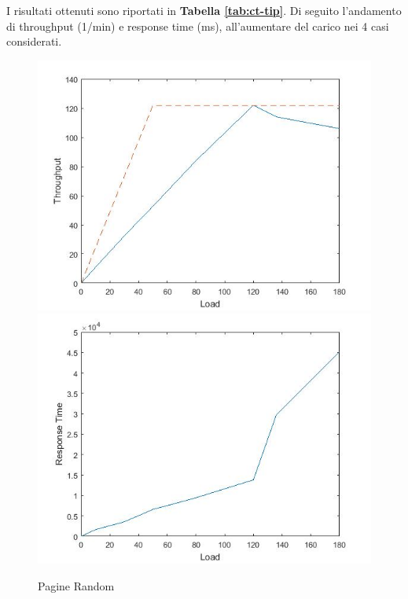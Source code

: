 		I risultati ottenuti sono riportati in \textbf{Tabella \ref{tab:ct-tip}}. Di seguito l'andamento di throughput (1/min) e response time (ms), all'aumentare del carico nei 4 casi considerati.
		
		\begin{figure}[H]
			\centering
			\includegraphics[scale=0.6]{./immagine/randomT.jpg}
			\includegraphics[scale=0.6]{./immagine/randomR.jpg}
			\caption{Pagine Random}
			\label{fig:ct-r}
		\end{figure}
